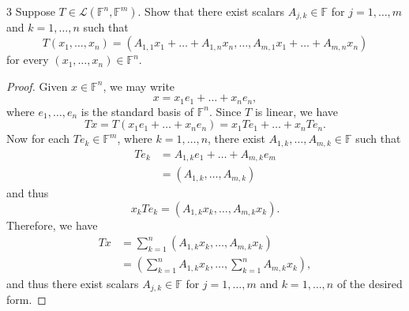 \documentclass[11pt]{extarticle}
\newenvironment{problem}[1]{\begin{prob*}{#1}{}}{\end{prob*}}
\newcommand{\F}{\mathbb{F}}
\newcommand{\Hom}{\mathcal{L}}
\begin{document}
\begin{problem}{3}
Suppose $T\in \Hom(\F^n,\F^m)$.  Show that there exist scalars $A_{j,k}\in\F$ for $j=1,\dots,m$ and $k=1,\dots,n$ such that
\begin{equation*}
T(x_1,\dots,x_n) = (A_{1,1}x_1 + \dots + A_{1,n}x_n,\dots, A_{m,1}x_1 + \dots + A_{m,n}x_n)
\end{equation*}
for every $(x_1,\dots,x_n)\in\F^n$.
\end{problem}
\begin{proof}
Given $x\in\F^n$, we may write
\begin{equation*}
x = x_1 e_1 + \dots + x_n e_n,
\end{equation*}
where $e_1,\dots,e_n$ is the standard basis of $\F^n$.  Since $T$ is linear, we have
\begin{equation*}
Tx = T(x_1 e_1 + \dots +x_n e_n) = x_1 Te_1 + \dots + x_n Te_n.
\end{equation*}
Now for each $Te_k\in\F^m$, where $k=1,\dots, n$, there exist $A_{1,k},\dots, A_{m,k}\in\F$ such that
\begin{align*}
Te_k &= A_{1,k}e_1 + \dots + A_{m,k}e_m\\
        &= \left(A_{1,k}, \dots, A_{m,k}\right)
\end{align*}
and thus 
\begin{equation*}
x_kTe_k = \left(A_{1,k}x_k, \dots, A_{m,k}x_k\right).
\end{equation*}
Therefore, we have
\begin{align*}
Tx &= \sum_{k = 1}^n \left(A_{1,k}x_k, \dots, A_{m,k}x_k\right)\\
     &= \left(\sum_{k = 1}^nA_{1,k}x_k, \dots, \sum_{k = 1}^nA_{m,k}x_k \right),
\end{align*}
and thus there exist scalars $A_{j,k}\in\F$ for $j=1,\dots,m$ and $k=1,\dots,n$ of the desired form.
\end{proof}
\end{document}
